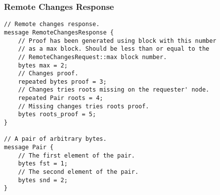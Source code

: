 \documentclass{book}
\begin{document}
\subsubsection{Remote Changes Response}

\begin{lstlisting}[frame=single]
// Remote changes response.
message RemoteChangesResponse {
    // Proof has been generated using block with this number
    // as a max block. Should be less than or equal to the
    // RemoteChangesRequest::max block number.
	bytes max = 2;
	// Changes proof.
	repeated bytes proof = 3;
	// Changes tries roots missing on the requester' node.
	repeated Pair roots = 4;
	// Missing changes tries roots proof.
	bytes roots_proof = 5;
}

// A pair of arbitrary bytes.
message Pair {
	// The first element of the pair.
	bytes fst = 1;
	// The second element of the pair.
	bytes snd = 2;
}
\end{lstlisting}
\end{document}
